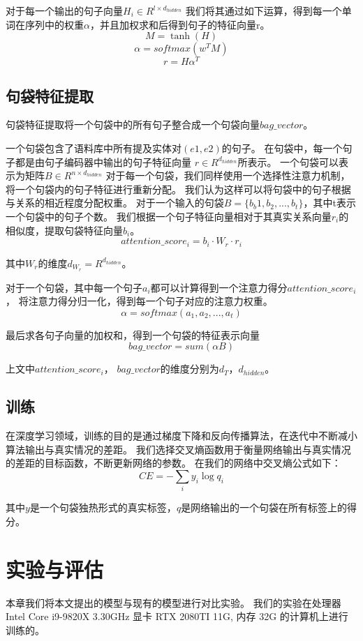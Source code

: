 \documentclass[UTF8]{csoarticle}
\begin{document}
对于每一个输出的句子向量$ H_i \in R^{l \times d_{hidden}} $
我们将其通过如下运算，得到每一个单词在序列中的权重$\alpha$，并且加权求和后得到句子的特征向量r。
\[ M= \tanh(H) \]
\[ \alpha = softmax(w^T M) \]
\[ r = H \alpha^T \]

\subsection{句袋特征提取}
句袋特征提取将一个句袋中的所有句子整合成一个句袋向量$bag\_vector$。

一个句袋包含了语料库中所有提及实体对$(e1, e2)$的句子。
在句袋中，每一个句子都是由句子编码器中输出的句子特征向量 $r \in R^{d_{hidden}}$所表示。
一个句袋可以表示为矩阵$B \in R^{n \times d_{hidden}}$
对于每一个句袋，我们同样使用一个选择性注意力机制，将一个句袋内的句子特征进行重新分配。
我们认为这样可以将句袋中的句子根据与关系的相近程度分配权重。
对于一个输入的句袋$B = \{b_b1, b_2,...,b_t\}$，其中t表示一个句袋中的句子个数。
我们根据一个句子特征向量相对于其真实关系向量$r_i$的相似度，提取句袋特征向量$b_i$。
\[attention\_score_i =  b_i\cdot W_r \cdot r_i\]

其中$W_r$的维度$d_{W_r} = R^{d_{hidden}}$。

对于一个句袋，其中每一个句子$a_i$都可以计算得到一个注意力得分$attention\_score_i$，
将注意力得分归一化，得到每一个句子对应的注意力权重。
\[\alpha = softmax({a_1,a_2,...,a_t})\]

最后求各句子向量的加权和，得到一个句袋的特征表示向量
\[bag\_vector = sum(\alpha  B)\]

上文中$attention\_score_i$， $bag\_vector$的维度分别为$d_T$，$d_{hidden}$。

\subsection{训练}
在深度学习领域，训练的目的是通过梯度下降和反向传播算法，在迭代中不断减小算法输出与真实情况的差距。
我们选择交叉熵函数用于衡量网络输出与真实情况的差距的目标函数，不断更新网络的参数。
在我们的网络中交叉熵公式如下：
\[ CE =-\sum _{i}y_i \log q_i\]

其中$y$是一个句袋独热形式的真实标签，$q$是网络输出的一个句袋在所有标签上的得分。
\section{实验与评估}
本章我们将本文提出的模型与现有的模型进行对比实验。
我们的实验在处理器 Intel Core i9-9820X 3.30GHz 显卡 RTX 2080TI 11G, 内存 32G 的计算机上进行训练的。
\end{document}
